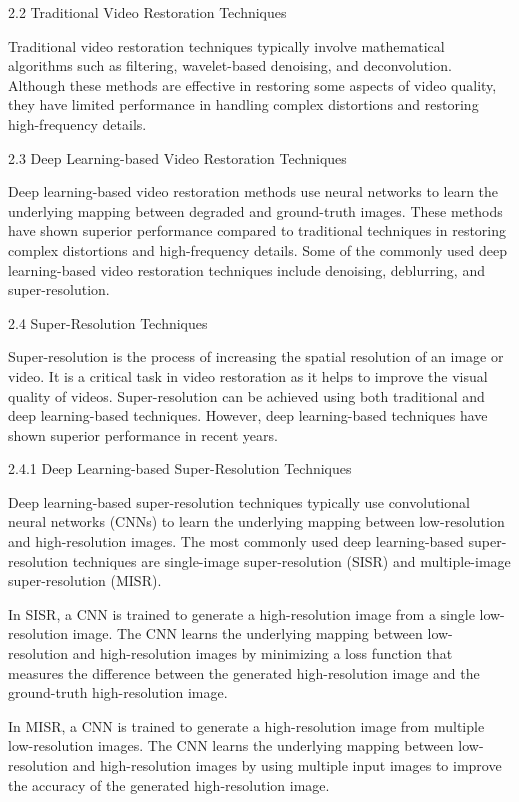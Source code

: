 2.2 Traditional Video Restoration Techniques

Traditional video restoration techniques typically involve mathematical algorithms such as filtering, wavelet-based denoising, and deconvolution. Although these methods are effective in restoring some aspects of video quality, they have limited performance in handling complex distortions and restoring high-frequency details.

2.3 Deep Learning-based Video Restoration Techniques

Deep learning-based video restoration methods use neural networks to learn the underlying mapping between degraded and ground-truth images. These methods have shown superior performance compared to traditional techniques in restoring complex distortions and high-frequency details. Some of the commonly used deep learning-based video restoration techniques include denoising, deblurring, and super-resolution.

2.4 Super-Resolution Techniques

Super-resolution is the process of increasing the spatial resolution of an image or video. It is a critical task in video restoration as it helps to improve the visual quality of videos. Super-resolution can be achieved using both traditional and deep learning-based techniques. However, deep learning-based techniques have shown superior performance in recent years.

2.4.1 Deep Learning-based Super-Resolution Techniques

Deep learning-based super-resolution techniques typically use convolutional neural networks (CNNs) to learn the underlying mapping between low-resolution and high-resolution images. The most commonly used deep learning-based super-resolution techniques are single-image super-resolution (SISR) and multiple-image super-resolution (MISR).

In SISR, a CNN is trained to generate a high-resolution image from a single low-resolution image. The CNN learns the underlying mapping between low-resolution and high-resolution images by minimizing a loss function that measures the difference between the generated high-resolution image and the ground-truth high-resolution image.

In MISR, a CNN is trained to generate a high-resolution image from multiple low-resolution images. The CNN learns the underlying mapping between low-resolution and high-resolution images by using multiple input images to improve the accuracy of the generated high-resolution image.

